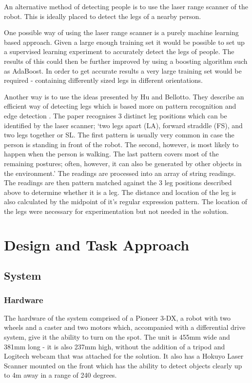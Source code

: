 An alternative method of detecting people is to use the laser range scanner of the robot. This is ideally placed to detect the legs of a nearby person.

One possible way of using the laser range scanner is a purely machine learning based approach. Given a large enough training set it would be possible to set up a supervised learning experiment to accurately detect the legs of people. The results of this could then be further improved by using a boosting algorithm such as AdaBoost. In order to get accurate results a very large training set would be required - containing differently sized legs in different orientations.

Another way is to use the ideas presented by Hu and Bellotto. They describe an efficient way of detecting legs which is based more on pattern recognition and edge detection \parencite{4695975}. The paper recognises 3 distinct leg positions which can be identified by the laser scanner; ‘two legs apart (LA), forward straddle (FS), and two legs together or SL. The first pattern is usually very common in case the person is standing in front of the robot. The second, however, is most likely to happen when the person is walking. The last pattern covers most of the remaining postures; often, however, it can also be generated by other objects in the environment.’ The readings are processed into an array of string readings. The readings are then pattern matched against the 3 leg positions described above to determine whether it is a leg. The distance and location of the leg is also calculated by the midpoint of it’s regular expression pattern. The location of the legs were necessary for experimentation but not needed in the solution.

\section{Design and Task Approach}

\subsection{System}

\subsubsection{Hardware}

The hardware of the system comprised of a Pioneer 3-DX, a robot with two wheels and a caster and two motors which, accompanied with a differential drive system, give it the ability to turn on the spot. The unit is 455mm wide and 381mm long - it is also 237mm high, without the addition of a tripod and Logitech webcam that was attached for the solution. It also has a Hokuyo Laser Scanner mounted on the front which has the ability to detect objects clearly up to 4m away in a range of 240 degrees.

